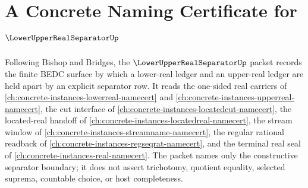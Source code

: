\chapter{A Concrete Naming Certificate for $\LowerUpperRealSeparatorUp$}
\label{ch:concrete-instances-lower-upper-real-separator-namecert}

Following Bishop and Bridges, the $\LowerUpperRealSeparatorUp$ packet records the finite BEDC surface by which a lower-real ledger and an upper-real ledger are held apart by an explicit separator row. It reads the one-sided real carriers of \autoref{ch:concrete-instances-lowerreal-namecert} and \autoref{ch:concrete-instances-upperreal-namecert}, the cut interface of \autoref{ch:concrete-instances-locatedcut-namecert}, the located-real handoff of \autoref{ch:concrete-instances-locatedreal-namecert}, the stream window of \autoref{ch:concrete-instances-streamname-namecert}, the regular rational readback of \autoref{ch:concrete-instances-regseqrat-namecert}, and the terminal real seal of \autoref{ch:concrete-instances-real-namecert}. The packet names only the constructive separator boundary; it does not assert trichotomy, quotient equality, selected suprema, countable choice, or host completeness.

